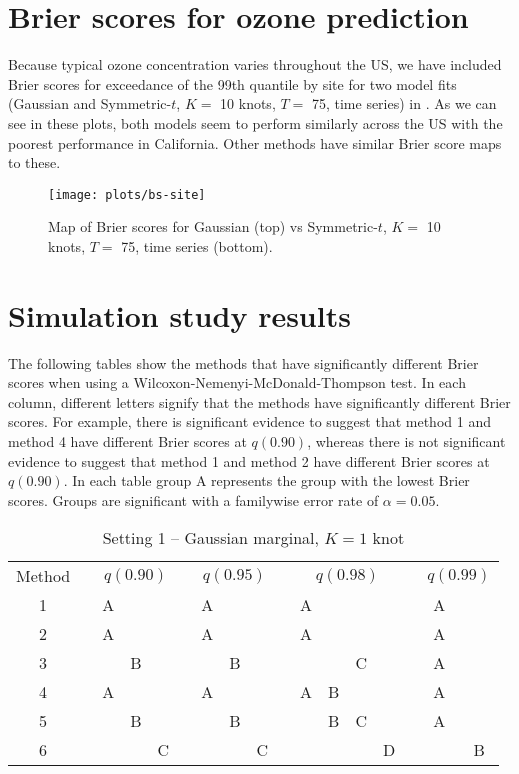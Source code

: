 \section{Brier scores for ozone prediction} \label{sta:ozonesite}

Because typical ozone concentration varies throughout the US, we have included Brier scores for exceedance of the 99th quantile by site for two model fits (Gaussian and Symmetric-$t$, $K = $ 10 knots, $T = $ 75, time series) in .
As we can see in these plots, both models seem to perform similarly across the US with the poorest performance in California.
Other methods have similar Brier score maps to these.
\begin{figure}
  \centering
  \texttt{[image: plots/bs-site]}
  \caption{Map of Brier scores for Gaussian (top) vs Symmetric-$t$, $K = $ 10 knots, $T = $ 75, time series (bottom).}
  \label{stfig:bssite}
\end{figure}

\section{Simulation study results} \label{sta:pdiffs}

The following tables show the methods that have significantly different Brier scores when using a Wilcoxon-Nemenyi-McDonald-Thompson test.
In each column, different letters signify that the methods have significantly different Brier scores.
For example, there is significant evidence to suggest that method 1 and method 4 have different Brier scores at $q(0.90)$, whereas there is not significant evidence to suggest that method 1 and method 2 have different Brier scores at $q(0.90)$.
In each table group A represents the group with the lowest Brier scores.
Groups are significant with a familywise error rate of $\alpha = 0.05$.

\begin{table}[htbp]
  \centering
  \caption{Setting 1 -- Gaussian marginal, $K = 1$ knot}
  \label{sttbl:gaussim}
  \begin{tabular}{c c ccc c ccc c cccc c cc}
  \toprule
     Method & \phantom{a} & \multicolumn{3}{c}{$q(0.90)$} & \phantom{a} & \multicolumn{3}{c}{$q(0.95)$} & \phantom{a} & \multicolumn{4}{c}{$q(0.98)$} & \phantom{a} & \multicolumn{2}{c}{$q(0.99)$} \\
    \cmidrule{1-1} \cmidrule{3-5} \cmidrule{7-9} \cmidrule{11-14} \cmidrule{16-17}
    1 && A &   &   && A &   &   && A &   &   &   && A &   \\
    2 && A &   &   && A &   &   && A &   &   &   && A &   \\
    3 &&   & B &   &&   & B &   &&   &   & C &   && A &   \\
    4 && A &   &   && A &   &   && A & B &   &   && A &   \\
    5 &&   & B &   &&   & B &   &&   & B & C &   && A &   \\
    6 &&   &   & C &&   &   & C &&   &   &   & D &&   & B \\
    \bottomrule
  \end{tabular}
\end{table}


